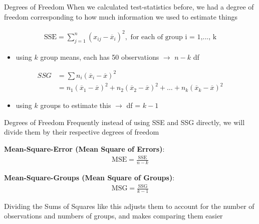 \documentclass{beamer}
\begin{document}
\begin{frame}{Degrees of Freedom}
When we calculated test-statistics before, we had a degree of freedom corresponding to how much information we used to estimate things

\begin{align*}
\text{SSE} = \sum_{j=1}^n (x_{ij} - \overline{x}_i)^2, \text{ for each of group i = 1,..., k}
\end{align*} \vspace{-2mm}

\begin{itemize}
    \item using $k$ group means, each has 50 observations $\rightarrow$ $n-k$ df
\end{itemize} \vspace{4mm}

\begin{align*}
SSG &= \sum n_i(\overline{x}_i - \overline{x})^2 \\
&= n_1(\overline{x}_1 - \overline{x})^2 + n_2(\overline{x}_2 - \overline{x})^2 + \dots + n_k(\overline{x}_k - \overline{x})^2
\end{align*}

\begin{itemize}
    \item using $k$ groups to estimate this $\rightarrow$ df = $k-1$
\end{itemize}

\end{frame}

\begin{frame}{Degrees of Freedom}
Frequently instead of using SSE and SSG directly, we will divide them by their respective degrees of freedom \vspace{10mm}

\textbf{Mean-Square-Error (Mean Square of Errors)}:
\begin{align*}
\text{MSE} = \frac{\text{SSE}}{n-k}
\end{align*} \vspace{4mm}

\textbf{Mean-Square-Groups (Mean Square of Groups)}:
\begin{align*}
\text{MSG} = \frac{\text{SSG}}{k-1}
\end{align*} \vspace{3mm}

Dividing the Sums of Squares like this adjusts them to account for the number of observations and numbers of groups, and makes comparing them easier
\end{frame}
\end{document}
